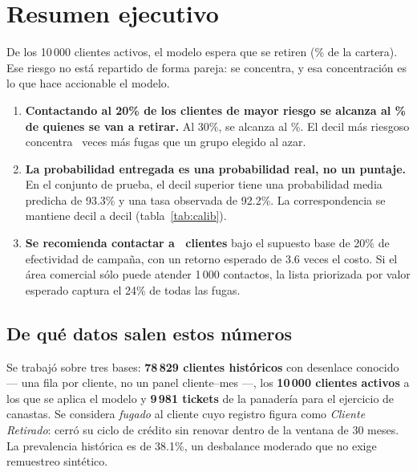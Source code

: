\documentclass[11pt,a4paper]{article}
\begin{document}
\clearpage
\tableofcontents
\clearpage

\section{Resumen ejecutivo}

De los 10\,000 clientes activos, el modelo espera que se retiren
\textbf{\FugasEsperadas} (\ProbMedia\% de la cartera). Ese riesgo no está
repartido de forma pareja: se concentra, y esa concentración es lo que hace
accionable el modelo.

\begin{hallazgo}
\begin{enumerate}[leftmargin=*,nosep]
  \item \textbf{Contactando al 20\% de los clientes de mayor riesgo se alcanza al
        \CapturaVeinte\% de quienes se van a retirar.} Al 30\%, se alcanza al
        \CapturaTreinta\%. El decil más riesgoso concentra \LiftUno~veces más
        fugas que un grupo elegido al azar.
  \item \textbf{La probabilidad entregada es una probabilidad real, no un puntaje.}
        En el conjunto de prueba, el decil superior tiene una probabilidad media
        predicha de 93.3\% y una tasa observada de 92.2\%. La correspondencia se
        mantiene decil a decil (tabla~\ref{tab:calib}).
  \item \textbf{Se recomienda contactar a \NCampana\ clientes} bajo el supuesto
        base de 20\% de efectividad de campaña, con un retorno esperado de
        3.6 veces el costo. Si el área comercial sólo puede atender 1\,000
        contactos, la lista priorizada por valor esperado captura el 24\% de
        todas las fugas.
\end{enumerate}
\end{hallazgo}

\subsection*{De qué datos salen estos números}

Se trabajó sobre tres bases: \textbf{78\,829 clientes históricos} con desenlace
conocido --- una fila por cliente, no un panel cliente--mes ---, los
\textbf{10\,000 clientes activos} a los que se aplica el modelo y
\textbf{9\,981 tickets} de la panadería para el ejercicio de canastas. Se
considera \emph{fugado} al cliente cuyo registro figura como \emph{Cliente
Retirado}: cerró su ciclo de crédito sin renovar dentro de la ventana de 30
meses. La prevalencia histórica es de 38.1\%, un desbalance moderado que no
exige remuestreo sintético.
\end{document}
